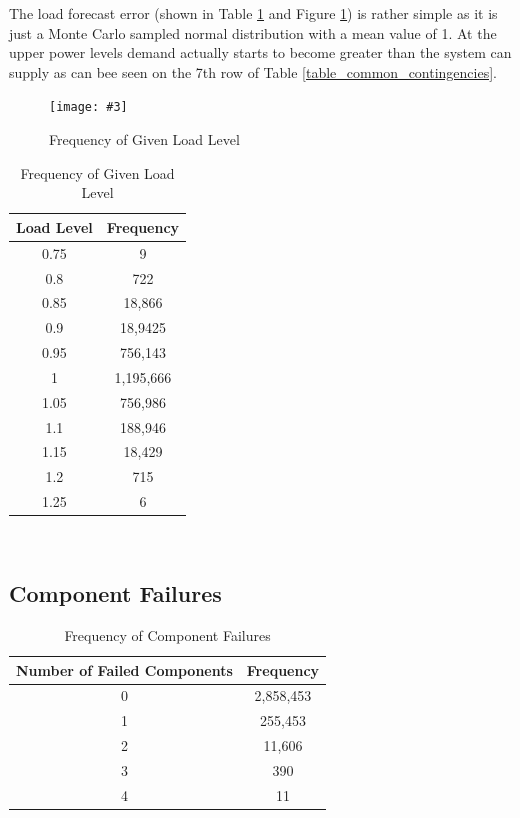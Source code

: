 \documentclass[a4paper,oneside,12pt]{report}
\newcommand{\image}[3] {
  \begin{figure}
    \begin{center}
      \texttt{[image: \#3]}
      \caption{#2}
      \label{#1}
    \end{center}
  \end{figure}
}
\begin{document}
The load forecast error (shown in Table \ref{table_contingency_load_level} and Figure \ref{loadforecaseerror}) is rather simple as it is just a Monte Carlo sampled normal distribution with a mean value of 1. At the upper power levels demand actually starts to become greater than the system can supply as can bee seen on the 7th row of Table \ref{table_common_contingencies}.

\image{loadforecaseerror}{Frequency of Given Load Level}{loadforecaseerror.png}

\begin{table}[htbp]
\caption{Frequency of Given Load Level}
\label{table_contingency_load_level}
\centering
\begin{tabular}{c||c}
\bfseries Load Level & \bfseries Frequency \\
\hline \hline
0.75 & 9 \\ 
0.8 & 722 \\ 
0.85 & 18,866 \\ 
0.9 & 18,9425 \\ 
0.95 & 756,143 \\ 
1 & 1,195,666 \\ 
1.05 & 756,986 \\ 
1.1 & 188,946 \\ 
1.15 & 18,429 \\ 
1.2 & 715 \\ 
1.25 & 6 \\ 
\hline
\end{tabular}\\
\end{table}


\subsection{Component Failures}

\begin{table}[htbp]
\caption{Frequency of Component Failures}
\label{table_contingency_component_failure}
\centering
\begin{tabular}{c||c}
\bfseries Number of Failed Components & \bfseries Frequency \\
\hline \hline
0 & 2,858,453 \\ 
1 & 255,453 \\ 
2 & 11,606 \\ 
3 & 390 \\ 
4 & 11 \\ 
\hline
\end{tabular}\\
\end{table}
\end{document}
